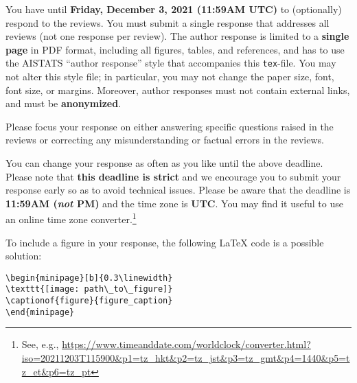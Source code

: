 \documentclass{article}
\begin{document}
You have until \textbf{Friday, December 3, 2021 (11:59AM UTC)} to (optionally) respond to the reviews. You must submit a single response that addresses all reviews (not one response per review). The author response is limited to a \textbf{single page} in PDF format, including all figures, tables, and references, and has to use the AISTATS ``author response'' style that accompanies this \texttt{tex}-file. You may not alter this style file; in particular, you may not change the paper size, font, font size, or margins. Moreover, author responses must not contain external links, and must be \textbf{anonymized}.

Please focus your response on either answering specific questions raised in the reviews or correcting any misunderstanding or factual errors in the reviews.

You can change your response as often as you like until the above deadline. Please note that \textbf{this deadline is strict} and we encourage you to submit your response early so as to avoid technical issues. Please be aware that the deadline is \textbf{11:59AM (\textit{not} PM)} and the time zone is \textbf{UTC}. You may find it useful to use an online time zone converter.\footnote{See, e.g., \url{https://www.timeanddate.com/worldclock/converter.html?iso=20211203T115900&p1=tz_hkt&p2=tz_jst&p3=tz_gmt&p4=1440&p5=tz_et&p6=tz_pt}}


To include a figure in your response, the following LaTeX code is a possible solution:

\begin{verbatim}
\begin{minipage}[b]{0.3\linewidth}
\texttt{[image: path\_to\_figure]}
\captionof{figure}{figure_caption}
\end{minipage}
\end{verbatim}
\end{document}
